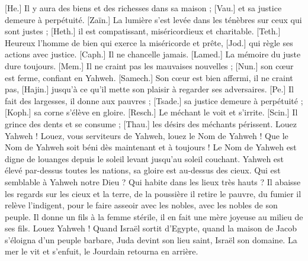 \begin{multicols}{2}
[He.] Il y aura des biens et des richesses dans sa maison ; [Vau.] et sa justice demeure à perpétuité.
[Zaïn.] La lumière s'est levée dans les ténèbres sur ceux qui sont justes ; [Heth.] il est compatissant, miséricordieux et charitable.
[Teth.] Heureux l'homme de bien qui exerce la miséricorde et prête, [Jod.] qui règle ses actions avec justice.
[Caph.] Il ne chancelle jamais. [Lamed.] La mémoire du juste dure toujours.
[Mem.] Il ne craint pas les mauvaises nouvelles ; [Nun.] son cœur est ferme, confiant en Yahweh.
[Samech.] Son cœur est bien affermi, il ne craint pas, [Hajin.] jusqu’à ce qu'il mette son plaisir à regarder ses adversaires.
[Pe.] Il fait des largesses, il donne aux pauvres ; [Tsade.] sa justice demeure à perpétuité ; [Koph.] sa corne s’élève en gloire.
[Resch.] Le méchant le voit et s’irrite. [Scin.] Il grince des dents et se consume ; [Thau.] les désirs des méchants périssent.
\VerseOne{}Louez Yahweh ! Louez, vous serviteurs de Yahweh, louez le Nom de Yahweh !
Que le Nom de Yahweh soit béni dès maintenant et à toujours !
Le Nom de Yahweh est digne de louanges depuis le soleil levant jusqu’au soleil couchant.
Yahweh est élevé par-dessus toutes les nations, sa gloire est au-dessus des cieux.
Qui est semblable à Yahweh notre Dieu ? Qui habite dans les lieux très hauts ?
Il abaisse les regards sur les cieux et la terre,
de la poussière il retire le pauvre, du fumier il relève l’indigent,
pour le faire asseoir avec les nobles, avec les nobles de son peuple.
Il donne un fils à la femme stérile, il en fait une mère joyeuse au milieu de ses fils. Louez Yahweh !
\VerseOne{}Quand Israël sortit d'Egypte, quand la maison de Jacob s’éloigna d’un peuple barbare,
Juda devint son lieu saint, Israël son domaine.
La mer le vit et s'enfuit, le Jourdain retourna en arrière.

\end{multicols}
